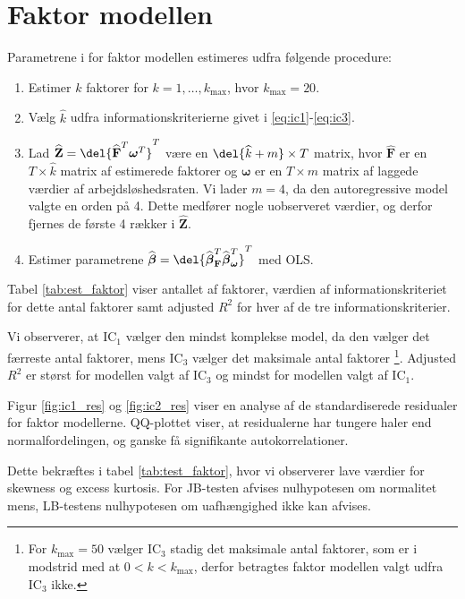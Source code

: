 \section{Faktor modellen}
Parametrene i for faktor modellen estimeres udfra følgende procedure:
\begin{enumerate}
\item Estimer $k$ faktorer for $k = 1, \dots, k_{\max}$, hvor $k_{\max} = 20$.  
\item Vælg $\widehat{k}$ udfra informationskriterierne givet i \eqref{eq:ic1}-\eqref{eq:ic3}.
\item Lad \(\widehat{\textbf{Z}} = \del{\widehat{{\textbf{F}}}^T\boldsymbol{\omega}^T}^T\) være en \(\del{\widehat{k}+m} \times T\) matrix, hvor \(\widehat{{\textbf{F}}}\) er en \(T \times \widehat{k}\) matrix af estimerede faktorer og \(\boldsymbol{\omega}\) er en \(T \times m\) matrix af laggede værdier af arbejdsløshedsraten.
Vi lader \(m = 4\), da den autoregressive model valgte en orden på 4.
Dette medfører nogle uobserveret værdier, og derfor fjernes de første 4 rækker i \(\widehat{\textbf{Z}}\).
\item Estimer parametrene $\widehat{\boldsymbol{\beta}} = \del{ \widehat{\boldsymbol{\beta}}^T_{\textbf{F}} \widehat{\boldsymbol{\beta}}^T_{\boldsymbol{\omega}}}^T$ med OLS.
\end{enumerate}

Tabel \ref{tab:est_faktor} viser antallet af faktorer, værdien af informationskriteriet for dette antal faktorer samt adjusted \(R^2\) for hver af de tre informationskriterier. 


Vi observerer, at IC$_1$ vælger den mindst komplekse model, da den vælger det færreste antal faktorer, mens IC$_3$ vælger det maksimale antal faktorer \footnote{For \(k_\text{max} = 50\) vælger IC\(_3\) stadig det maksimale antal faktorer, som er i modstrid med at \(0<k<k_\text{max}\), derfor betragtes faktor modellen valgt udfra IC\(_3\) ikke.}. 
Adjusted \(R^2\) er størst for modellen valgt af IC$_3$ og mindst for modellen valgt af IC$_1$.

Figur \ref{fig:ic1_res} og \ref{fig:ic2_res} viser en analyse af de standardiserede residualer for faktor modellerne.
QQ-plottet viser, at residualerne har tungere haler end normalfordelingen, og ganske få signifikante autokorrelationer.


Dette bekræftes i tabel \ref{tab:test_faktor}, hvor vi observerer lave værdier for skewness og excess kurtosis. 
For JB-testen afvises nulhypotesen om normalitet mens, LB-testens nulhypotesen om uafhængighed ikke kan afvises. 

